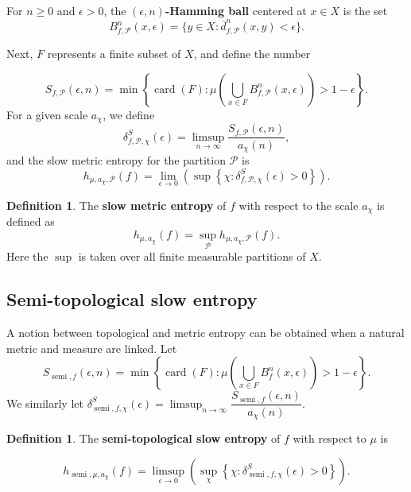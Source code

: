\documentclass[oneside]{amsart}
\theoremstyle{plain}
\theoremstyle{definition}
\newtheorem{DEF}[THM]{Definition}
\DeclareMathOperator{\card}{card}
\newcommand{\<}{\langle}
\renewcommand{\>}{\rangle}
\renewcommand{\P}{\mathcal{P}}
\newcommand{\e}{\epsilon}
\renewcommand{\bar}{\overline}
\renewcommand{\|}{|\!|} %
\newcommand{\semitop}{\operatorname{semi}} %
\begin{document}
For $n \geq 0$ and $\e > 0$, the {\bf $(\e,n)$-Hamming ball} centered at $x \in X$ is the set
\begin{equation*}
    B^n_{f,\P}(x,\e) = \{ y \in X:  \bar{d}_{f,\P}^n(x,y) < \e \}.
\end{equation*}

Next, $F$ represents a finite subset of $X$, and define the number

\begin{equation*}
    S_{f,\P}(\e,n) = \min \left\{ \card(F): \mu\left( \bigcup_{x \in F} B^n_{f,\P}(x,\e) \right) > 1-\e\right\}.
\end{equation*}
For a given scale $a_\chi$, we define
\begin{equation*}
    \delta_{f,\P,\chi}^S (\e)=\limsup_{n\to \infty}\frac{S_{f,\P}(\e,n) }{a_\chi(n)},
\end{equation*}
and the slow metric entropy for the partition $\P$ is 
\begin{equation*}
    h_{\mu,a_\chi,\P}(f)=\lim_{\e \to 0}\left( \sup \left\{ \chi: \delta_{f,\P,\chi}^S (\e) >0 \right\} \right).
\end{equation*}

\begin{DEF}
The \textbf{slow metric entropy} of $f$ with respect to the scale $a_\chi$ is defined as
\begin{equation*}
    h_{\mu,a_\chi}(f) = \sup_{\P}h_{\mu,a_\chi,\P}(f).
\end{equation*}
Here the $\sup$ is taken over all finite measurable partitions of $X$.
\end{DEF}


\subsection{Semi-topological slow entropy}


A notion between topological and metric entropy can be obtained when a natural metric and measure are linked. Let
\begin{equation*}
    S_{\semitop,f}(\e,n) = \min \left\lbrace{\card(F) : \mu\left(\bigcup_{x \in F} B_f^n(x,\e)\right) > 1-\epsilon}\right\rbrace.
\end{equation*}
We similarly let $\delta_{\semitop,f,\chi} ^S (\e) = \displaystyle\limsup_{n \to \infty} \dfrac{S_{\semitop,f}(\e,n)}{a_\chi(n)}$.

\begin{DEF}
    The {\bf semi-topological slow entropy} of $f$ with respect to $\mu$ is

    \[ h_{\semitop,\mu,a_\chi}(f) = \limsup_{\e \to 0}\left( \sup_\chi \left \{ \chi : \delta_{\semitop,f,\chi} ^S (\e) > 0 \right \}\right).\]
\end{DEF}
\end{document}
